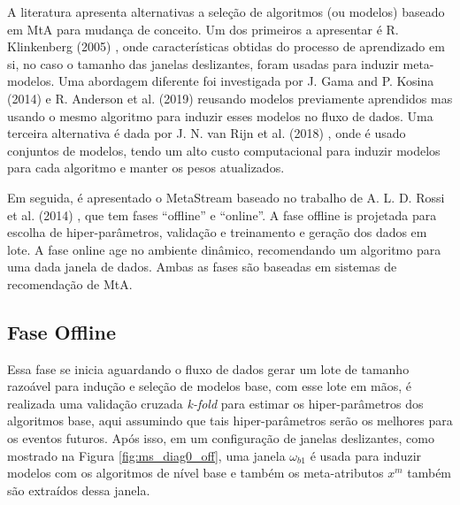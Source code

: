 
A literatura apresenta alternativas a seleção de algoritmos (ou modelos)
baseado em MtA para mudança de conceito. Um dos primeiros a apresentar é R.
Klinkenberg (2005) \cite{klinkenberg2005}, onde características obtidas do
processo de aprendizado em si, no caso o tamanho das janelas deslizantes, foram
usadas para induzir meta-modelos.
Uma abordagem diferente foi investigada por J. Gama and P. Kosina (2014)
\cite{gama2014} e R. Anderson et al. (2019) \cite{Anderson2019}
reusando modelos previamente aprendidos mas usando o mesmo algoritmo para
induzir esses modelos no fluxo de dados. Uma terceira alternativa é dada por J.
N. van Rijn et al. (2018) \cite{VanRijn2018}, onde é usado conjuntos de
modelos, tendo um alto custo computacional para induzir modelos para cada
algoritmo e manter os pesos atualizados.

Em seguida, é apresentado o MetaStream baseado no trabalho de A. L. D. Rossi et
al. (2014) \cite{rossi2014metastream}, que tem fases ``offline'' e ``online''.
A fase offline is projetada para escolha de hiper-parâmetros, validação e
treinamento e geração dos dados em lote.
A fase online age no ambiente dinâmico, recomendando um algoritmo para uma dada
janela de dados. Ambas as fases são baseadas em sistemas de recomendação de
MtA.


\subsection{Fase Offline}
\label{subsubsec:offline}
Essa fase se inicia aguardando o fluxo de dados gerar um lote de tamanho
razoável para indução e seleção de modelos base, com esse lote em mãos, é
realizada uma validação cruzada \textit{k-fold} para estimar os
hiper-parâmetros dos algoritmos base, aqui assumindo que tais hiper-parâmetros
serão os melhores para os eventos futuros.
Após isso, em um configuração de janelas deslizantes, como mostrado na Figura
\ref{fig:ms_diag0_off}, uma janela $\omega_{b1}$ é usada para induzir modelos
com os algoritmos de nível base e também os meta-atributos $x^m$ também são
extraídos dessa janela.

